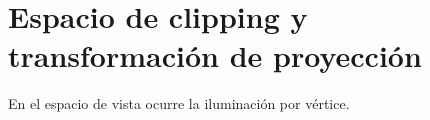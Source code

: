 \chapter{Espacio de clipping y transformación de proyección}
En el espacio de vista ocurre la iluminación por vértice.

